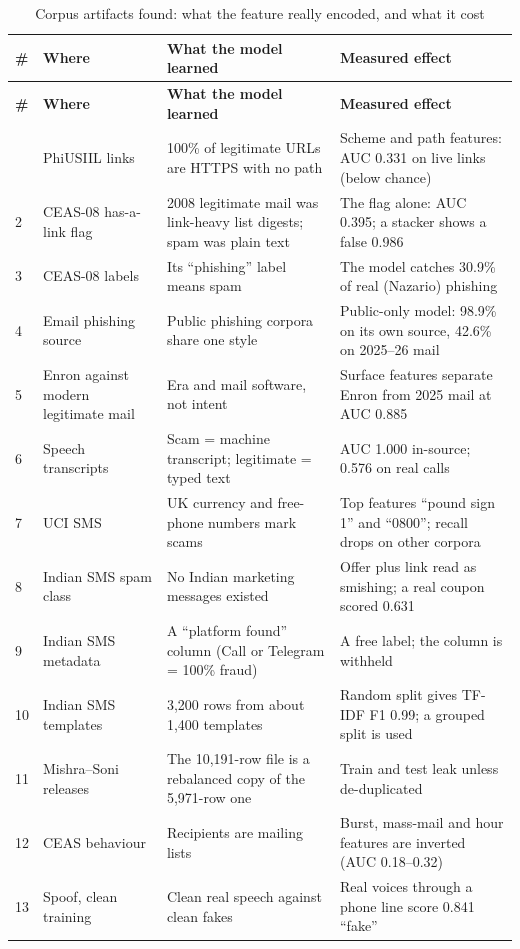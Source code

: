 {{\small{}
\begin{longtable}{|p{0.6cm}|p{3.0cm}|p{5.3cm}|p{4.8cm}|}
\caption{Corpus artifacts found: what the feature really encoded, and what it cost}\label{tab:artifacts}\\
\hline \textbf{\#} & \textbf{Where} & \textbf{What the model learned} & \textbf{Measured effect} \\ \hline
\endfirsthead
\hline \textbf{\#} & \textbf{Where} & \textbf{What the model learned} & \textbf{Measured effect} \\ \hline
\endhead
\hline
\endfoot
1 & PhiUSIIL links & 100\% of legitimate URLs are HTTPS with no path & Scheme and path features: AUC 0.331 on live links (below chance) \\ \hline
2 & CEAS-08 has-a-link flag & 2008 legitimate mail was link-heavy list digests; spam was plain text & The flag alone: AUC 0.395; a stacker shows a false 0.986 \\ \hline
3 & CEAS-08 labels & Its ``phishing'' label means spam & The model catches 30.9\% of real (Nazario) phishing \\ \hline
4 & Email phishing source & Public phishing corpora share one style & Public-only model: 98.9\% on its own source, 42.6\% on 2025--26 mail \\ \hline
5 & Enron against modern legitimate mail & Era and mail software, not intent & Surface features separate Enron from 2025 mail at AUC 0.885 \\ \hline
6 & Speech transcripts & Scam = machine transcript; legitimate = typed text & AUC 1.000 in-source; 0.576 on real calls \\ \hline
7 & UCI SMS & UK currency and free-phone numbers mark scams & Top features ``pound sign 1'' and ``0800''; recall drops on other corpora \\ \hline
8 & Indian SMS spam class & No Indian marketing messages existed & Offer plus link read as smishing; a real coupon scored 0.631 \\ \hline
9 & Indian SMS metadata & A ``platform found'' column (Call or Telegram = 100\% fraud) & A free label; the column is withheld \\ \hline
10 & Indian SMS templates & 3{,}200 rows from about 1{,}400 templates & Random split gives TF-IDF F1 0.99; a grouped split is used \\ \hline
11 & Mishra--Soni releases & The 10{,}191-row file is a rebalanced copy of the 5{,}971-row one & Train and test leak unless de-duplicated \\ \hline
12 & CEAS behaviour & Recipients are mailing lists & Burst, mass-mail and hour features are inverted (AUC 0.18--0.32) \\ \hline
13 & Spoof, clean training & Clean real speech against clean fakes & Real voices through a phone line score 0.841 ``fake'' \\ \hline
\end{longtable}
}

}
